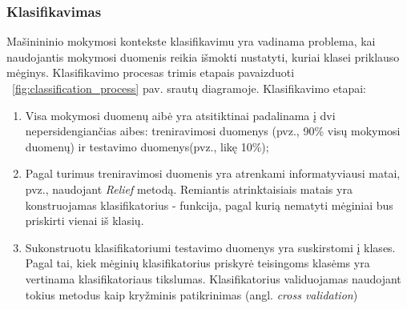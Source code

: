 
\subsubsection{Klasifikavimas}

Mašinininio mokymosi kontekste klasifikavimu yra vadinama problema, kai naudojantis mokymosi duomenis reikia išmokti nustatyti, kuriai klasei priklauso mėginys. Klasifikavimo procesas trimis etapais pavaizduoti ~\ref{fig:classification_process} pav. srautų diagramoje. Klasifikavimo etapai:
\begin{enumerate}
 \item Visa mokymosi duomenų aibė yra atsitiktinai padalinama į dvi nepersidengiančias aibes: treniravimosi duomenys (pvz., 90\% visų mokymosi duomenų) ir testavimo duomenys(pvz., likę 10\%);
 \item Pagal turimus treniravimosi duomenis yra atrenkami informatyviausi matai, pvz., naudojant \textit{Relief} metodą. Remiantis atrinktaisiais matais yra konstruojamas klasifikatorius - funkcija, pagal kurią nematyti mėginiai bus priskirti vienai iš klasių.
 \item Sukonstruotu klasifikatoriumi testavimo duomenys yra suskirstomi į klases. Pagal tai, kiek mėginių klasifikatorius priskyrė teisingoms klasėms yra vertinama klasifikatoriaus tikslumas. Klasifikatorius validuojamas naudojant tokius metodus kaip kryžminis patikrinimas (angl. \textit{cross validation})
\end{enumerate}

